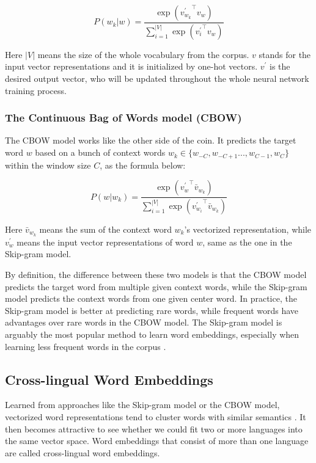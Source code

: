 \documentclass[thesis,fonts=libertine]{cluu}
\begin{document}
\begin{equation*}
  P(w_k|w)=\frac{\exp({v_{w_k}^\prime}^\intercal v_w)}{\sum_{i=1}^{|V|}\exp({v^\prime_i}^\intercal v_w)}
\end{equation*}

\noindent Here $|V|$ means the size of the whole vocabulary from the corpus. $v$ stands for the input vector representations and it is initialized by one-hot vectors. $v^\prime$ is the desired output vector, who will be updated throughout the whole neural network training process. 

\subsubsection{The Continuous Bag of Words model (CBOW)}
The CBOW model works like the other side of the coin. It predicts the target word $w$ based on a bunch of context words $w_k \in \{w_{-C}, w_{-C+1} ..., w_{C-1}, w_C\}$ within the window size $C$, as the formula below:

\begin{equation*}
  P(w|w_k)=\frac{\exp({v^\prime_w}^\intercal \bar{v}_{w_k})}{\sum^{|V|}_{i=1}\exp({v^\prime_{w_i}}^\intercal \bar{v}_{w_k})}
\end{equation*}

\noindent Here $\bar{v}_{w_k}$ means the sum of the context word $w_k$'s vectorized representation, while $v^\prime_w$ means the input vector representations of word $w$, same as the one in the Skip-gram model.

By definition, the difference between these two models is that the CBOW model predicts the target word from multiple given context words, while the Skip-gram model predicts the context words from one given center word. In practice, the Skip-gram model is better at predicting rare words, while frequent words have advantages over rare words in the CBOW model. The Skip-gram model is arguably the most popular method to learn word embeddings, especially when learning less frequent words in the corpus \parencite{levy-etal-2015-improving}.

\subsection{Cross-lingual Word Embeddings}
\label{sec:multilingual_word_embeddings}

Learned from approaches like the Skip-gram model or the CBOW model, vectorized word representations tend to cluster words with similar semantics \parencite{Mikolov:2013ac}. It then becomes attractive to see whether we could fit two or more languages into the same vector space. Word embeddings that consist of more than one language are called cross-lingual word embeddings.
\end{document}
